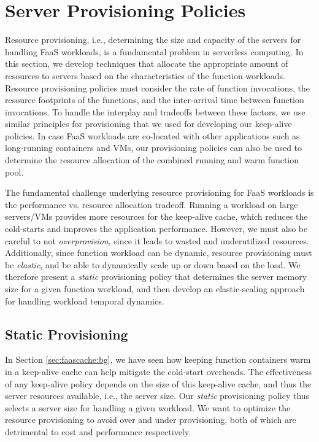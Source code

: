 \section{Server Provisioning Policies} %
\label{sec:provision}

Resource provisioning, i.e., determining the size and capacity of the servers for handling FaaS workloads, is a fundamental problem in serverless computing. 
In this section, we develop techniques that allocate the appropriate amount of resources to servers based on the characteristics of the function workloads. 
Resource provisioning policies must consider the rate of function invocations, the resource footprints of the functions, and the inter-arrival time between function invocations. 
To handle the interplay and tradeoffs between these factors, we use similar principles for provisioning that we used for developing our keep-alive policies. 
In case FaaS workloads are co-located with other applications such as long-running containers and VMs, our provisioning policies can also be used to determine the resource allocation of the combined running and warm function pool. 

The fundamental challenge underlying resource provisioning for FaaS workloads is the performance vs. resource allocation tradeoff. 
Running a workload on large servers/VMs provides more resources for the keep-alive cache, which reduces the cold-starts and improves the application performance. 
However, we must also be careful to not \emph{overprovision}, since it leads to wasted and underutilized resources.
Additionally, since function workload can be dynamic, resource provisioning must be \emph{elastic}, and be able to dynamically scale up or down based on the load. 
We therefore present a \emph{static} provisioning policy that determines the server memory size for a given function workload, and then develop an elastic-scaling approach for handling workload temporal dynamics. 

\subsection{Static Provisioning}
\label{subsec:static}

In Section \ref{sec:faascache:bg}, we have seen how keeping function containers warm in a keep-alive cache can help mitigate the cold-start overheads. 
The effectiveness of any keep-alive policy depends on the size of this keep-alive cache, and thus the server resources available, i.e., the server size. 
Our \emph{static} provisioning policy thus selects a server size for handling a given workload. 
We want to optimize the resource provisioning to avoid over and under provisioning, both of which are detrimental to cost and performance respectively. 


